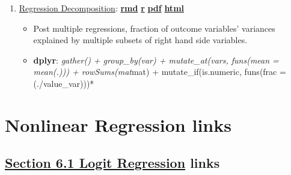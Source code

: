 \documentclass[
]{book}
\providecommand{\tightlist}{%
  \setlength{\itemsep}{0pt}\setlength{\parskip}{0pt}}
\begin{document}
\begin{enumerate}
\def\labelenumi{\arabic{enumi}.}
\tightlist
\item
  \href{https://fanwangecon.github.io/R4Econ/linreg/decompose/htmlpdfr/fs_lin_decompose.html}{Regression Decomposition}: \href{https://github.com/FanWangEcon/R4Econ/blob/master/linreg/decompose//fs_lin_decompose.Rmd}{\textbf{rmd}} \textbar{} \href{https://github.com/FanWangEcon/R4Econ/blob/master/linreg/decompose/htmlpdfr/fs_lin_decompose.R}{\textbf{r}} \textbar{} \href{https://github.com/FanWangEcon/R4Econ/blob/master/linreg/decompose/htmlpdfr/fs_lin_decompose.pdf}{\textbf{pdf}} \textbar{} \href{https://fanwangecon.github.io/R4Econ/linreg/decompose/htmlpdfr/fs_lin_decompose.html}{\textbf{html}}

  \begin{itemize}
  \tightlist
  \item
    Post multiple regressions, fraction of outcome variables' variances explained by multiple subsets of right hand side variables.
  \item
    \textbf{dplyr}: \emph{gather() + group\_by(var) + mutate\_at(vars, funs(mean = mean(.))) + rowSums(mat}mat) + mutate\_if(is.numeric, funs(frac = (./value\_var)))*
  \end{itemize}
\end{enumerate}

\hypertarget{nonlinear-regression-links}{%
\section{Nonlinear Regression links}\label{nonlinear-regression-links}}

\hypertarget{section-6.1-logit-regressionlogit-regression-links}{%
\subsection{\texorpdfstring{\protect\hyperlink{logit-regression}{Section 6.1 Logit Regression} links}{Section 6.1 Logit Regression links}}\label{section-6.1-logit-regressionlogit-regression-links}}
\end{document}
